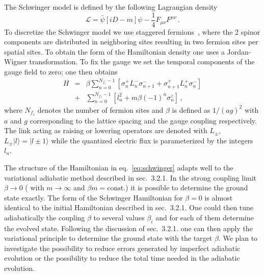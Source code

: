 \documentclass[10pt]{article}
\begin{document}
The Schwinger model is defined by the following
Lagrangian density
\begin{equation}
  \mathcal{L} = \bar\psi \left[i D - m\right]\psi - \frac{1}{4}F_{\mu\nu}F^{\mu\nu}\,.
\end{equation}  
To discretize the Schwinger model we use staggered fermions~\cite{Kogut:1974ag,Banks:1975gq}, where
the 2 spinor components are distributed in neighboring sites resulting in
two fermion sites per spatial sites.
To obtain the form of the Hamiltonian density one uses a Jordan-Wigner
transformation. To fix the gauge we set the temporal components
of the gauge field to zero; one then obtains~\cite{Kuhn:2014rha,Klco:2018kyo}
\begin{eqnarray}
H &=& \beta \sum_{n=0}^{N_{f_s}-1} \left[\sigma_n^{+} L_n^- \sigma_{n+1}^{-} +
  \sigma_{n+1}^{+} L_n^+ \sigma_{n}^{-}\right] \\ \nonumber
&+& \sum_{n=0}^{N_{f_s}-1}\left[ l_n^2 + m \beta (-1)^n \sigma_n^z\right]\,,
\label{eq:schwinger}
\end{eqnarray}
where $N_{f_s}$ denotes the number of fermion sites
and  $\beta$ is defined as $1/(ag)^2$ with $a$ and $g$ corresponding to the lattice spacing and
 the gauge coupling respectively. The link acting as raising or lowering operators are
denoted with $L_{\pm}$, $L_{\pm} |l\rangle = |l \pm 1 \rangle$
while the quantized electric flux is parameterized by the integers $l_n$.

The structure of the Hamiltonian in eq.~\eqref{eq:schwinger} adapts well to the
variational adiabatic method described in sec.~3.2.1. %
In the strong coupling limit
$\beta \rightarrow 0$ ( with $m \rightarrow \infty$ and $\beta m = \textrm{const.}$)
it is possible to determine the ground state exactly.
The form of the Schwinger Hamiltonian for $\beta = 0$ is almost identical to the
initial Hamiltonian described in sec.~3.2.1. %
One could then tune adiabatically the coupling $\beta$ to several values
$\beta_i$ and for each of them determine the evolved state.
Following the discussion of sec.~3.2.1.%
one can then apply the variational
principle to determine the ground state with the target $\beta$.
We plan to investigate the possibility to reduce
errors generated by imperfect adiabatic evolution 
or the possibility to reduce the
total time needed in the adiabatic evolution.

\end{document}
